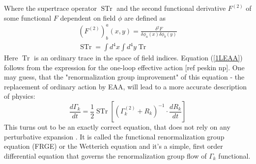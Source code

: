 \documentclass[11pt, a4paper]{article}
\begin{document}
Where the supertrace operator $ \operatorname{STr}$ and the second functional derivative $F^{(2)}$ of some functional $F$ dependent on field $\phi$ are defined as
\begin{gather}
    (F^{(2)})^a_b(x,y) = \frac{\delta^2 F}{\delta\phi_a(x)\delta\phi_b(y)}\\
    \operatorname{STr} = \int d^4 x \int d^4 y \operatorname{Tr}
\end{gather}
Here $\operatorname{Tr}$ is an ordinary trace in the space of field indices.
Equation (\ref{1LEAA}) follows from the expression for the one-loop effective action [ref peskin np]. 
One may guess, that the "renormalization group improvement" of this equation - the replacement of ordinary action by
 EAA, will lead to a more accurate description of physics:
\begin{equation}
    \frac{d \Gamma_k}{dt} = \frac{1}{2} \operatorname{STr} \left[ \left(\Gamma_k^{(2)} + R_k\right)^{-1} \cdot \frac{d R_k}{dt} \right]
    \label{FRGE}
\end{equation}
This turns out to be an exactly correct equation, that does not rely on any perturbative expansion \cite{wetteq}.
It is called the functional renormalization group equation (FRGE) or the Wetterich equation and
it's a simple, first order differential equation that governs the renormalization group flow of $\Gamma_k$ functional.
\end{document}
